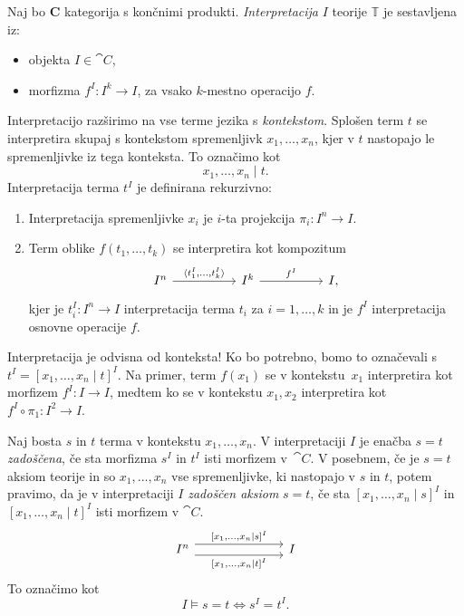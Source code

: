 \documentclass[../kategoricna_logika.tex]{subfiles}
\begin{document}
\begin{definicija}
  Naj bo $\mathbf{C}$ kategorija s končnimi
  produkti. \emph{Interpretacija} $I$ teorije $\mathbb{T}$ je
  sestavljena iz:
  \begin{itemize}
  \item objekta $I \in \cat{C}$,
  \item morfizma $f^I : I^k \to I$, za vsako $k$-mestno operacijo $f$.
  \end{itemize}
%
  Interpretacijo razširimo na vse terme jezika s \emph{kontekstom}.
  Splošen term $t$ se interpretira skupaj s
  kontekstom spremenljivk $x_1, \ldots, x_n$, kjer v $t$ nastopajo le
  spremenljivke iz tega konteksta. To označimo kot
$$x_1, \ldots, x_n \mid t.$$
%
Interpretacija terma $t^I$ je definirana rekurzivno:
  \begin{enumerate}
  \item Interpretacija spremenljivke $x_i$ je $i$-ta projekcija
    $\pi_i : I^n \to I.$
%
  \item Term oblike $f(t_1, \ldots, t_k)$ se interpretira kot
    kompozitum
    \begin{equation*}
      \begin{tikzcd}[column sep = 5em]
        I^n \ar[r, "{\langle t_1^I, \ldots, t_k^I\rangle}"] & I^k \ar[r, "f^I"] & I,
      \end{tikzcd}
    \end{equation*}
    kjer je $t_i^I : I^n \to I$ interpretacija terma $t_i$ za
    $i = 1, \ldots, k$ in je $f^I$ interpretacija osnovne operacije
    $f$.
  \end{enumerate}
\end{definicija}
%
\begin{opomba}
Interpretacija je odvisna od konteksta! Ko bo potrebno, bomo to označevali s
$t^I = [x_1, \ldots, x_n \mid t]^I$. Na primer, 
  term $f(x_1)$ se v kontekstu~$x_1$ interpretira kot morfizem
  $f^I : I \to I$, medtem ko se v kontekstu $x_1, x_2$ interpretira
  kot $f^I \circ \pi_1 : I^2 \to I$.
\end{opomba}
%
\begin{definicija}
  Naj bosta $s$ in $t$ terma v kontekstu $x_1, \ldots, x_n$.  V
  interpretaciji $I$ je enačba $s = t$ \emph{zadoščena}, če sta
  morfizma $s^I$ in $t^I$ isti morfizem v~$\cat{C}$.  V posebnem, če
  je $s = t$ aksiom teorije in so $x_1, \ldots, x_n$ vse
  spremenljivke, ki nastopajo v $s$ in $t$, potem pravimo, da je v
  interpretaciji $I$ \emph{zadoščen aksiom} $s = t$, če sta
  $[x_1, \ldots, x_n \mid s]^I$ in $[x_1, \ldots, x_n \mid t]^I$ isti
  morfizem v $\cat{C}$.
  \begin{equation*}
    \begin{tikzcd}[column sep = 7em]
      I^n \ar[r, shift left=1ex, "{[x_1, \ldots, x_n \mid s]^I}"]
      \ar[r, shift right=1ex, "{[x_1, \ldots, x_n \mid t]^I}"'] & I
    \end{tikzcd}
  \end{equation*}
  To označimo kot
  \[I \models s = t \iff s^I = t^I.\]
\end{definicija}
\end{document}
